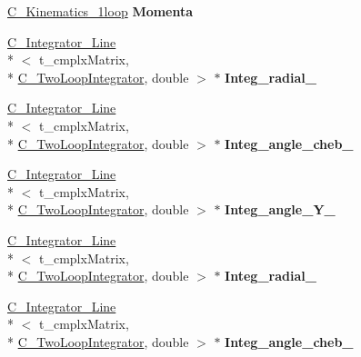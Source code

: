 \begin{DoxyCompactItemize}
\item 
\hypertarget{class_c___two_loop_integrator_a392696e474b2c1425a4b6f5e0a1dce81}{\hyperlink{class_c___kinematics__1loop}{C\-\_\-\-Kinematics\-\_\-1loop} {\bfseries Momenta}}\label{class_c___two_loop_integrator_a392696e474b2c1425a4b6f5e0a1dce81}

\item 
\hypertarget{class_c___two_loop_integrator_a75731a963d66b374c41d263947bc59a5}{\hyperlink{class_c___integrator___line}{C\-\_\-\-Integrator\-\_\-\-Line}\\*
$<$ t\-\_\-cmplx\-Matrix, \\*
\hyperlink{class_c___two_loop_integrator}{C\-\_\-\-Two\-Loop\-Integrator}, double $>$ $\ast$ {\bfseries Integ\-\_\-radial\-\_}}\label{class_c___two_loop_integrator_a75731a963d66b374c41d263947bc59a5}

\item 
\hypertarget{class_c___two_loop_integrator_a9a804dbc1716786cffded2109557c873}{\hyperlink{class_c___integrator___line}{C\-\_\-\-Integrator\-\_\-\-Line}\\*
$<$ t\-\_\-cmplx\-Matrix, \\*
\hyperlink{class_c___two_loop_integrator}{C\-\_\-\-Two\-Loop\-Integrator}, double $>$ $\ast$ {\bfseries Integ\-\_\-angle\-\_\-cheb\-\_}}\label{class_c___two_loop_integrator_a9a804dbc1716786cffded2109557c873}

\item 
\hypertarget{class_c___two_loop_integrator_a9bffc1bf665dc791881989f04c65be3f}{\hyperlink{class_c___integrator___line}{C\-\_\-\-Integrator\-\_\-\-Line}\\*
$<$ t\-\_\-cmplx\-Matrix, \\*
\hyperlink{class_c___two_loop_integrator}{C\-\_\-\-Two\-Loop\-Integrator}, double $>$ $\ast$ {\bfseries Integ\-\_\-angle\-\_\-\-Y\-\_}}\label{class_c___two_loop_integrator_a9bffc1bf665dc791881989f04c65be3f}

\item 
\hypertarget{class_c___two_loop_integrator_a688ffe22b5525381c260d74b3bf1a9f9}{\hyperlink{class_c___integrator___line}{C\-\_\-\-Integrator\-\_\-\-Line}\\*
$<$ t\-\_\-cmplx\-Matrix, \\*
\hyperlink{class_c___two_loop_integrator}{C\-\_\-\-Two\-Loop\-Integrator}, double $>$ $\ast$ {\bfseries Integ\-\_\-radial\-\_}}\label{class_c___two_loop_integrator_a688ffe22b5525381c260d74b3bf1a9f9}

\item 
\hypertarget{class_c___two_loop_integrator_ac4ffebf8d8bbe580382ee24c8af744c4}{\hyperlink{class_c___integrator___line}{C\-\_\-\-Integrator\-\_\-\-Line}\\*
$<$ t\-\_\-cmplx\-Matrix, \\*
\hyperlink{class_c___two_loop_integrator}{C\-\_\-\-Two\-Loop\-Integrator}, double $>$ $\ast$ {\bfseries Integ\-\_\-angle\-\_\-cheb\-\_}}\label{class_c___two_loop_integrator_ac4ffebf8d8bbe580382ee24c8af744c4}


\end{DoxyCompactItemize}

